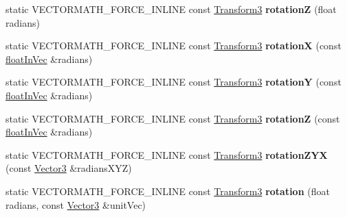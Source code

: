 \begin{DoxyCompactItemize}
static V\+E\+C\+T\+O\+R\+M\+A\+T\+H\+\_\+\+F\+O\+R\+C\+E\+\_\+\+I\+N\+L\+I\+NE const \hyperlink{classVectormath_1_1Aos_1_1Transform3}{Transform3} {\bfseries rotationZ} (float radians)
\item 
\mbox{\label{classVectormath_1_1Aos_1_1Transform3_ade0f353703a1de22afd0302668d9b4e6}} 
static V\+E\+C\+T\+O\+R\+M\+A\+T\+H\+\_\+\+F\+O\+R\+C\+E\+\_\+\+I\+N\+L\+I\+NE const \hyperlink{classVectormath_1_1Aos_1_1Transform3}{Transform3} {\bfseries rotationX} (const \hyperlink{classVectormath_1_1floatInVec}{float\+In\+Vec} \&radians)
\item 
\mbox{\label{classVectormath_1_1Aos_1_1Transform3_ab54dbcbccfc22149eb94b4e76f0a361a}} 
static V\+E\+C\+T\+O\+R\+M\+A\+T\+H\+\_\+\+F\+O\+R\+C\+E\+\_\+\+I\+N\+L\+I\+NE const \hyperlink{classVectormath_1_1Aos_1_1Transform3}{Transform3} {\bfseries rotationY} (const \hyperlink{classVectormath_1_1floatInVec}{float\+In\+Vec} \&radians)
\item 
\mbox{\label{classVectormath_1_1Aos_1_1Transform3_a6e92d7a62b99b507f50c36b6c55c92ca}} 
static V\+E\+C\+T\+O\+R\+M\+A\+T\+H\+\_\+\+F\+O\+R\+C\+E\+\_\+\+I\+N\+L\+I\+NE const \hyperlink{classVectormath_1_1Aos_1_1Transform3}{Transform3} {\bfseries rotationZ} (const \hyperlink{classVectormath_1_1floatInVec}{float\+In\+Vec} \&radians)
\item 
\mbox{\label{classVectormath_1_1Aos_1_1Transform3_aad365810aad9f102e9cea050d30e6859}} 
static V\+E\+C\+T\+O\+R\+M\+A\+T\+H\+\_\+\+F\+O\+R\+C\+E\+\_\+\+I\+N\+L\+I\+NE const \hyperlink{classVectormath_1_1Aos_1_1Transform3}{Transform3} {\bfseries rotation\+Z\+YX} (const \hyperlink{classVectormath_1_1Aos_1_1Vector3}{Vector3} \&radians\+X\+YZ)
\item 
\mbox{\label{classVectormath_1_1Aos_1_1Transform3_a828430d04b8d99b8c6b6540d198834d9}} 
static V\+E\+C\+T\+O\+R\+M\+A\+T\+H\+\_\+\+F\+O\+R\+C\+E\+\_\+\+I\+N\+L\+I\+NE const \hyperlink{classVectormath_1_1Aos_1_1Transform3}{Transform3} {\bfseries rotation} (float radians, const \hyperlink{classVectormath_1_1Aos_1_1Vector3}{Vector3} \&unit\+Vec)
\item 
\mbox{\label{classVectormath_1_1Aos_1_1Transform3_a4d664f72ed4dfd6986004cb5bc15bd36}} 

\end{DoxyCompactItemize}
